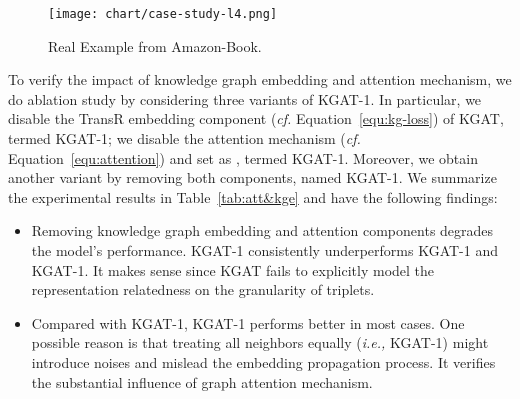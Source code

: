 \documentclass[sigconf]{acmart}
\newcommand{\ie}{\emph{i.e., }}
\newcommand{\cf}{\emph{cf. }}
\theoremstyle{definition}
\begin{document}
\begin{table}[t]
\caption{Effect of knowledge graph embedding and attention mechanism.
}
\vspace{-10px}
\label{tab:att&kge}
\vspace{-10px}
\end{table}

\begin{figure}[t]
    \centering
	\texttt{[image: chart/case-study-l4.png]}
	\vspace{-10pt}
	\caption{Real Example from Amazon-Book.}
	\label{fig:case-study}
	\vspace{-15pt}
\end{figure}

To verify the impact of knowledge graph embedding and attention mechanism, we do ablation study by considering three variants of KGAT-1.
In particular, we disable the TransR embedding component (\cf Equation~\eqref{equ:kg-loss}) of KGAT, termed KGAT-1;
we disable the attention mechanism (\cf Equation~\eqref{equ:attention}) and set  as , termed KGAT-1.
Moreover, we obtain another variant by removing both components, named KGAT-1.
We summarize the experimental results in Table~\ref{tab:att&kge} and have the following findings:
\begin{itemize}[leftmargin=*]
    \item Removing knowledge graph embedding and attention components degrades the model's performance. KGAT-1 consistently underperforms KGAT-1 and KGAT-1.
    It makes sense since KGAT fails to explicitly model the representation relatedness on the granularity of triplets.
    
    
    \item Compared with KGAT-1, KGAT-1 performs better in most cases. One possible reason is that treating all neighbors equally (\ie KGAT-1) might introduce noises and mislead the embedding propagation process. 
    It verifies the substantial influence of graph attention mechanism.
\end{itemize}
\end{document}
